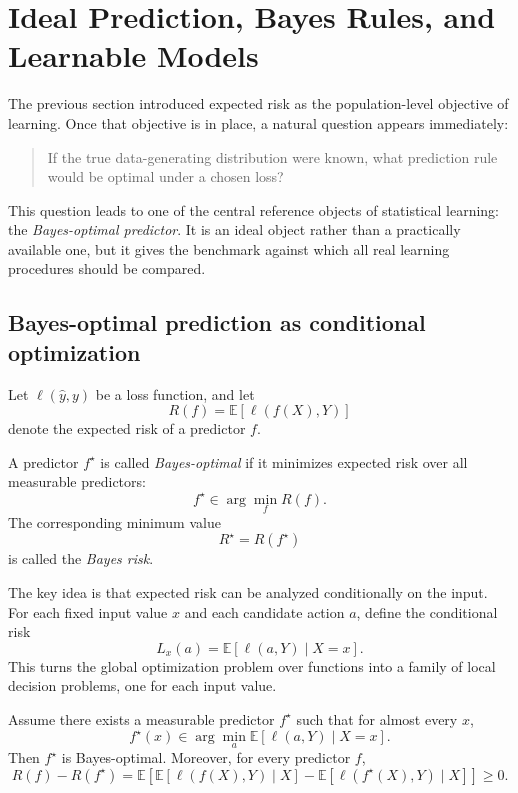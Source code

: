 \section{Ideal Prediction, Bayes Rules, and Learnable Models}

The previous section introduced expected risk as the population-level objective of learning. Once that objective is in place, a natural question appears immediately:

\begin{quote}
If the true data-generating distribution were known, what prediction rule would be optimal under a chosen loss?
\end{quote}

This question leads to one of the central reference objects of statistical learning: the \emph{Bayes-optimal predictor}. It is an ideal object rather than a practically available one, but it gives the benchmark against which all real learning procedures should be compared.

\subsection*{Bayes-optimal prediction as conditional optimization}

Let $\ell(\hat y,y)$ be a loss function, and let
\[
R(f)=\mathbb E[\ell(f(X),Y)]
\]
denote the expected risk of a predictor $f$.

\begin{definition}
A predictor $f^\star$ is called \emph{Bayes-optimal} if it minimizes expected risk over all measurable predictors:
\[
f^\star \in \arg\min_f R(f).
\]
The corresponding minimum value
\[
R^\star = R(f^\star)
\]
is called the \emph{Bayes risk}.
\end{definition}

The key idea is that expected risk can be analyzed conditionally on the input. For each fixed input value $x$ and each candidate action $a$, define the conditional risk
\[
L_x(a)=\mathbb E[\ell(a,Y)\mid X=x].
\]
This turns the global optimization problem over functions into a family of local decision problems, one for each input value.

\begin{theorem}
Assume there exists a measurable predictor $f^\star$ such that for almost every $x$,
\[
f^\star(x)\in \arg\min_a \mathbb E[\ell(a,Y)\mid X=x].
\]
Then $f^\star$ is Bayes-optimal. Moreover, for every predictor $f$,
\[
R(f)-R(f^\star)
=
\mathbb E\!\left[
\mathbb E[\ell(f(X),Y)\mid X]
-
\mathbb E[\ell(f^\star(X),Y)\mid X]
\right]
\ge 0.
\]
\end{theorem}

